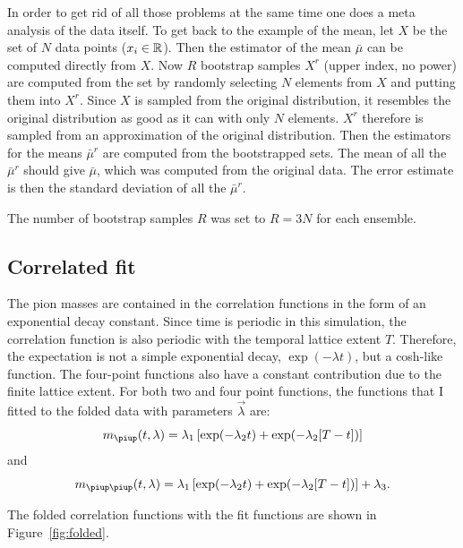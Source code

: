 \documentclass[11pt, english, fleqn, DIV=10, headinclude]{scrartcl}
\begin{document}
In order to get rid of all those problems at the same time one does a meta
analysis of the data itself. To get back to the example of the mean, let $X$ be
the set of $N$ data points ($x_i \in \mathbb R$). Then the estimator of the mean
$\bar\mu$ can be computed directly from $X$. Now $R$ bootstrap samples $X^r$
(upper index, no power) are computed from the set by randomly selecting $N$
elements from $X$ and putting them into $X^r$. Since $X$ is sampled from the
original distribution, it resembles the original distribution as good as it can
with only $N$ elements. $X^r$ therefore is sampled from an approximation of the
original distribution. Then the estimators for the means $\bar\mu^r$ are
computed from the bootstrapped sets. The mean of all the $\bar\mu^r$ should
give $\bar\mu$, which was computed from the original data. The error estimate
is then the standard deviation of all the $\bar\mu^r$.

The number of bootstrap samples $R$ was set to $R = 3N$ for each ensemble.

\subsection{Correlated fit}
\label{sec:correlated_fit}

The pion masses are contained in the correlation functions in the form of an
exponential decay constant. Since time is periodic in this simulation, the
correlation function is also periodic with the temporal lattice extent $T$.
Therefore, the expectation is not a simple exponential decay, $\exp(-\lambda
t)$, but a cosh-like function. The four-point functions also have a constant
contribution due to the finite lattice extent. For both two and four point
functions, the functions that I fitted to the folded data with parameters $\vec
\lambda$ are:
\begin{equation}
    \label{eq:fit2}
    m_\piup(t, \lambda) = \lambda_1 \sbr{\exp(-\lambda_2 t) + \exp(-\lambda_2
    [T - t])}
\end{equation}
and
\begin{equation}
    \label{eq:fit4}
    m_{\piup\piup}(t, \lambda) = \lambda_1 \sbr{\exp(-\lambda_2 t) + \exp(-\lambda_2
    [T - t])} + \lambda_3.
\end{equation}

The folded correlation functions with the fit functions are shown in
Figure~\ref{fig:folded}.
\end{document}

